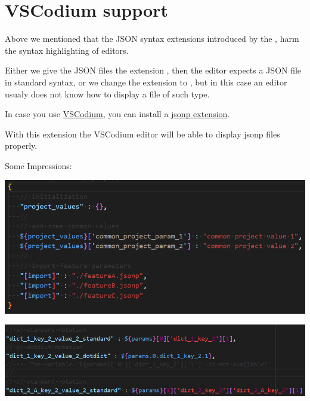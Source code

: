 

\newpage

\section{VSCodium support}

Above we mentioned that the JSON syntax extensions introduced by the \pkg, harm the syntax highlighting of editors.

Either we give the JSON files the extension , then the editor expects a JSON file in standard syntax,
or we change the extension to , but in this case an editor usualy does not know how to display a file of such type.

In case you use \href{https://vscodium.com/}{VSCodium}, you can install a
\href{https://github.com/test-fullautomation/vscode-jsonp}{jsonp extension}. 

With this extension the VSCodium editor will be able to display jsonp files properly.

Some Impressions:

\includegraphics{./pictures/screenshot1.png}

\vspace{2ex}

\includegraphics{./pictures/screenshot2.png}







